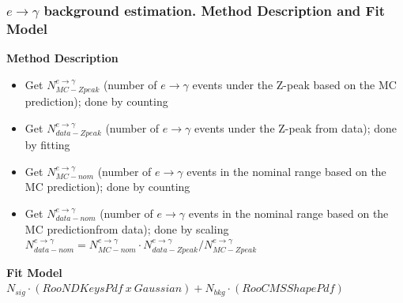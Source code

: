 \begin{frame}\frametitle{$e\rightarrow\gamma$ background estimation. Method Description and Fit Model}
{\footnotesize\bfseries{Method Description}}
\scriptsize
\begin{itemize}
  \item Get $N_{MC-Zpeak}^{e\rightarrow\gamma}$ (number of $e\rightarrow\gamma$ events under the Z-peak based on the MC prediction); done by counting
  \item Get $N_{data-Zpeak}^{e\rightarrow\gamma}$ (number of $e\rightarrow\gamma$ events under the Z-peak from data); done by fitting
  \item Get $N_{MC-nom}^{e\rightarrow\gamma}$ (number of $e\rightarrow\gamma$ events in the nominal range based on the MC prediction); done by counting
  \item Get $N_{data-nom}^{e\rightarrow\gamma}$ (number of $e\rightarrow\gamma$ events in the nominal range based on the MC predictionfrom data); done by scaling {\footnotesize\bfseries{$N_{data-nom}^{e\rightarrow\gamma} = N_{MC-nom}^{e\rightarrow\gamma} \cdot N_{data-Zpeak}^{e\rightarrow\gamma}/N_{MC-Zpeak}^{e\rightarrow\gamma}$}}
\end{itemize}

{\footnotesize\bfseries{Fit Model}}\\
\scriptsize
$N_{sig} \cdot (RooNDKeysPdf~x~Gaussian) +  N_{bkg} \cdot (RooCMSShapePdf)$\\
\end{frame}%

